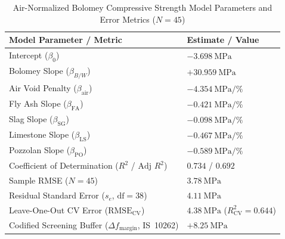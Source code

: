 \documentclass[journal]{IEEEtran}
\begin{document}
\begin{table}[!t]
\caption{Air-Normalized Bolomey Compressive Strength Model Parameters and Error Metrics ($N = 45$)}
\label{tab:strength_models}
\centering
\scriptsize
\renewcommand{\arraystretch}{0.70}
\begin{tabularx}{\columnwidth}{>{\raggedright\arraybackslash}X C{2.6cm}}
\toprule
\textbf{Model Parameter / Metric} & \textbf{Estimate / Value} \\
\midrule
Intercept ($\beta_0$) & $-3.698\ \mathrm{MPa}$ \\
Bolomey Slope ($\beta_{B/W}$) & $+30.959\ \mathrm{MPa}$ \\
Air Void Penalty ($\beta_{\mathrm{air}}$) & $-4.354\ \mathrm{MPa/\%}$ \\
Fly Ash Slope ($\beta_{\mathrm{FA}}$) & $-0.421\ \mathrm{MPa/\%}$ \\
Slag Slope ($\beta_{\mathrm{SG}}$) & $-0.098\ \mathrm{MPa/\%}$ \\
Limestone Slope ($\beta_{\mathrm{LS}}$) & $-0.467\ \mathrm{MPa/\%}$ \\
Pozzolan Slope ($\beta_{\mathrm{PO}}$) & $-0.589\ \mathrm{MPa/\%}$ \\
\midrule
Coefficient of Determination ($R^2$ / $\text{Adj } R^2$) & $0.734$ / $0.692$ \\
Sample RMSE ($N = 45$) & $\mathbf{3.78\ \mathrm{MPa}}$ \\
Residual Standard Error ($s_e$, $\text{df} = 38$) & $\mathbf{4.11\ \mathrm{MPa}}$ \\
Leave-One-Out CV Error ($\mathrm{RMSE}_{\mathrm{CV}}$) & $\mathbf{4.38\ \mathrm{MPa}}$ ($R^2_{\mathrm{CV}} = 0.644$) \\
Codified Screening Buffer ($\Delta f_{\mathrm{margin}}$, IS~10262) & $\mathbf{+8.25\ \mathrm{MPa}}$ \\
\bottomrule
\end{tabularx}
\end{table}
\end{document}
